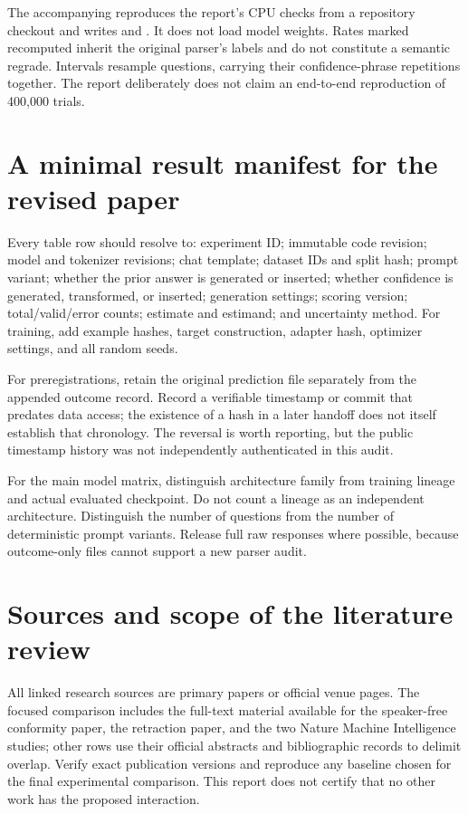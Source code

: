 \documentclass[11pt]{article}
\newcommand{\code}[1]{\texttt{\small\detokenize{#1}}}
\begin{document}
The accompanying \code{audit.py} reproduces the report's CPU checks from a repository checkout and writes \code{audit.json} and \code{audit_tables.csv}. It does not load model weights. Rates marked recomputed inherit the original parser's labels and do not constitute a semantic regrade. Intervals resample questions, carrying their confidence-phrase repetitions together. The report deliberately does not claim an end-to-end reproduction of 400,000 trials.

\section{A minimal result manifest for the revised paper}
Every table row should resolve to: experiment ID; immutable code revision; model and tokenizer revisions; chat template; dataset IDs and split hash; prompt variant; whether the prior answer is generated or inserted; whether confidence is generated, transformed, or inserted; generation settings; scoring version; total/valid/error counts; estimate and estimand; and uncertainty method. For training, add example hashes, target construction, adapter hash, optimizer settings, and all random seeds.

For preregistrations, retain the original prediction file separately from the appended outcome record. Record a verifiable timestamp or commit that predates data access; the existence of a hash in a later handoff does not itself establish that chronology. The reversal is worth reporting, but the public timestamp history was not independently authenticated in this audit.

For the main model matrix, distinguish architecture family from training lineage and actual evaluated checkpoint. Do not count a lineage as an independent architecture. Distinguish the number of questions from the number of deterministic prompt variants. Release full raw responses where possible, because outcome-only files cannot support a new parser audit.

\section{Sources and scope of the literature review}
\small
All linked research sources are primary papers or official venue pages. The focused comparison includes the full-text material available for the speaker-free conformity paper, the retraction paper, and the two Nature Machine Intelligence studies; other rows use their official abstracts and bibliographic records to delimit overlap. Verify exact publication versions and reproduce any baseline chosen for the final experimental comparison. This report does not certify that no other work has the proposed interaction.
\end{document}
